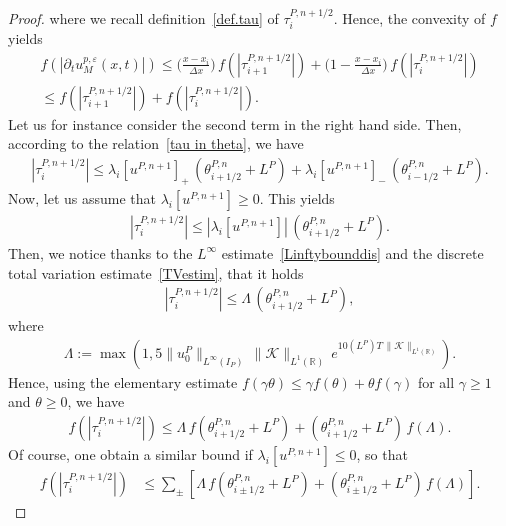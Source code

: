 \documentclass[11pt]{amsart}
\newcommand{\K}{\mathcal{K}}
\newcommand{\R}{\mathbb{R}}
\newcommand{\eps}{\varepsilon}
\begin{document}
\begin{proof}
where we recall definition~\eqref{def.tau} of $\tau^{P,n+1/2}_i$. Hence, the convexity of $f$ yields
\begin{multline*}
    f\left(\left|\partial_t u^{p, \eps}_M(x,t)\right|\right) \leq \bigg(\frac{x - x_i}{\Delta x}\bigg)\,f\left(\left|\tau_{i + 1}^{P, n + 1/2}\right|\right) + \bigg( 1 - \frac{x - x_i}{\Delta x}\bigg) \, f\left(\left|\tau_{i } ^{P, n +1/2}\right|\right)\\
    \leq f\left(\left|\tau_{i + 1}^{P, n + 1/2}\right|\right) +  f\left(\left|\tau_{i } ^{P, n +1/2}\right|\right).
\end{multline*}
Let us for instance consider the second term in the right hand side. Then, according to the relation~\eqref{tau in theta}, we have
\begin{align*}
    \left|\tau_i^{P, n +1/2}\right| \leq \lambda_i[u^{P, n + 1}]_+ \, \left(\theta_{i +1/2}^{P,n} + L^P\right) + \lambda_i[u^{P,n + 1}]_- \, \left(\theta_{i-1/2}^{P, n} + L^P\right).
\end{align*}
Now, let us assume that $\lambda_i[u^{P,n+1}]\ge 0$. This yields
\begin{align*}
    \left|\tau_i^{P, n +1/2}\right| \leq |\lambda_i[u^{P, n + 1}]| \, \left(\theta_{i +1/2}^{P,n} + L^P\right).
\end{align*}
Then, we notice thanks to the $L^\infty$ estimate~\eqref{Linftybounddis} and the discrete total variation estimate~\eqref{TVestim}, that it holds
\begin{align*}
    \left|\tau_i^{P, n +1/2}\right| \leq \Lambda\, \left(\theta_{i +1/2}^{P,n} + L^P\right),
\end{align*}
where
\begin{align*}
    \Lambda := \max\left(1,5\|u^P_0\|_{L^\infty(I_P)} \, \|\K\|_{L^1(\R)} \, e^{10 (L^P)T \, \|\K\|_{L^1(\R)}}\right).
\end{align*}
Hence, using the elementary estimate $f(\gamma \theta) \leq \gamma f(\theta)+\theta f(\gamma)$ for all $\gamma\geq 1$ and $\theta \geq 0$, we have
\begin{align*}
    f\left(\left|\tau_i^{P, n +1/2}\right|\right) \leq \Lambda\, f\left(\theta_{i +1/2}^{P,n} + L^P\right) + \left(\theta_{i +1/2}^{P,n} + L^P\right)  \, f\left(\Lambda\right).
\end{align*}
Of course, one obtain a similar bound if $\lambda_i[u^{P,n+1}]\le 0$, so that
\begin{align}\label{bound.ftau}
    f\left(\left|\tau_i^{P, n +1/2}\right|\right) &\leq \sum_{\pm} \left[\Lambda\, f\left(\theta_{i \pm 1/2}^{P,n} + L^P\right) + \left(\theta_{i \pm 1/2}^{P,n} + L^P\right)  \, f\left(\Lambda\right) \right].

\end{align}
\end{proof}
\end{document}
